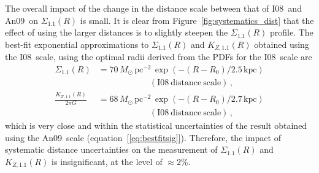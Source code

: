 \documentclass{emulateapj}
\newcommand{\eqnname}{equation}
\newcommand{\equationname}{\eqnname}
\renewcommand{\figurename}{Figure}
\newcommand{\kpc}{\ensuremath{\,\mathrm{kpc}}}
\newcommand{\sigoneone}{\ensuremath{\Sigma_{1.1}}}
\newcommand{\kzoneone}{\ensuremath{K_{Z,1.1}}}
\newcommand{\iv}{I08}
\newcommand{\an}{An09}
\begin{document}
The overall impact of the change in the distance scale between that of
\iv\ and \an\ on $\sigoneone(R)$ is small. It is clear from
\figurename~\ref{fig:systematics_dist} that the effect of using the
larger distances is to slightly steepen the $\sigoneone(R)$
profile. The best-fit exponential approximations to $\sigoneone(R)$
and $\kzoneone(R)$ obtained using the \iv\ scale, using the optimal
radii derived from the PDFs for the \iv\ scale are
\begin{align}
  \sigoneone(R) & = 70\,M_\odot\,\mathrm{pc}^{-2}\,\exp\left(-(R-R_0)/ 2.5\kpc\right)\nonumber\\
  & \qquad \qquad \qquad \mathrm{(\iv\ distance\ scale)}\,,\\
  \frac{\kzoneone(R)}{2\pi G} & = 68\,M_\odot\,\mathrm{pc}^{-2}\,\exp\left(-(R-R_0)/ 2.7\kpc\right)\nonumber\\
  & \qquad \qquad \qquad \mathrm{(\iv\ distance\ scale)}\,,
\end{align}
which is very close and within the statistical uncertainties of the
result obtained using the \an\ scale
(\equationname~[\ref{eq:bestfitsig}]). Therefore, the impact of
systematic distance uncertainties on the measurement of
$\sigoneone(R)$ and $\kzoneone(R)$ is insignificant, at the level of
$\approx2\%$.
\end{document}
